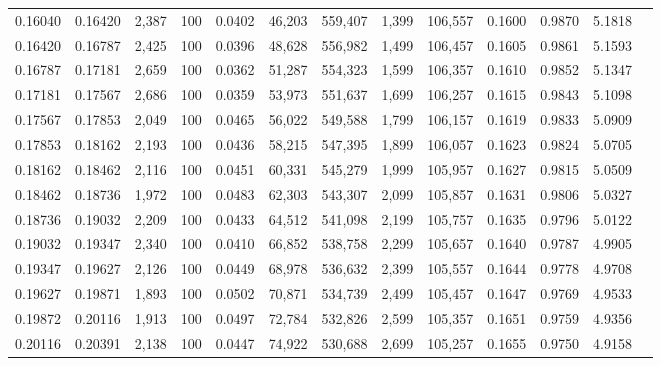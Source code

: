 \begin{tabular}{rrrrrrrrrrrrr}
0.16040 & 0.16420 & 2,387 & 100 &                                     0.0402 &  46,203 & 559,407 &   1,399 & 106,557 & 0.1600 & 0.9870 & 5.1818 \\
0.16420 & 0.16787 & 2,425 & 100 &                                     0.0396 &  48,628 & 556,982 &   1,499 & 106,457 & 0.1605 & 0.9861 & 5.1593 \\
0.16787 & 0.17181 & 2,659 & 100 &                                     0.0362 &  51,287 & 554,323 &   1,599 & 106,357 & 0.1610 & 0.9852 & 5.1347 \\
0.17181 & 0.17567 & 2,686 & 100 &                                     0.0359 &  53,973 & 551,637 &   1,699 & 106,257 & 0.1615 & 0.9843 & 5.1098 \\
0.17567 & 0.17853 & 2,049 & 100 &                                     0.0465 &  56,022 & 549,588 &   1,799 & 106,157 & 0.1619 & 0.9833 & 5.0909 \\
0.17853 & 0.18162 & 2,193 & 100 &                                     0.0436 &  58,215 & 547,395 &   1,899 & 106,057 & 0.1623 & 0.9824 & 5.0705 \\
0.18162 & 0.18462 & 2,116 & 100 &                                     0.0451 &  60,331 & 545,279 &   1,999 & 105,957 & 0.1627 & 0.9815 & 5.0509 \\
0.18462 & 0.18736 & 1,972 & 100 &                                     0.0483 &  62,303 & 543,307 &   2,099 & 105,857 & 0.1631 & 0.9806 & 5.0327 \\
0.18736 & 0.19032 & 2,209 & 100 &                                     0.0433 &  64,512 & 541,098 &   2,199 & 105,757 & 0.1635 & 0.9796 & 5.0122 \\
0.19032 & 0.19347 & 2,340 & 100 &                                     0.0410 &  66,852 & 538,758 &   2,299 & 105,657 & 0.1640 & 0.9787 & 4.9905 \\
0.19347 & 0.19627 & 2,126 & 100 &                                     0.0449 &  68,978 & 536,632 &   2,399 & 105,557 & 0.1644 & 0.9778 & 4.9708 \\
0.19627 & 0.19871 & 1,893 & 100 &                                     0.0502 &  70,871 & 534,739 &   2,499 & 105,457 & 0.1647 & 0.9769 & 4.9533 \\
0.19872 & 0.20116 & 1,913 & 100 &                                     0.0497 &  72,784 & 532,826 &   2,599 & 105,357 & 0.1651 & 0.9759 & 4.9356 \\
0.20116 & 0.20391 & 2,138 & 100 &                                     0.0447 &  74,922 & 530,688 &   2,699 & 105,257 & 0.1655 & 0.9750 & 4.9158 \\

\end{tabular}
